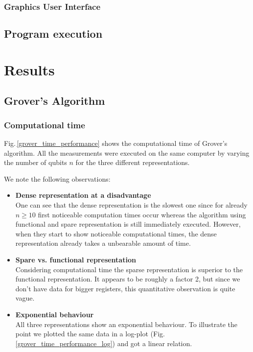 \documentclass[bibliography=totocnumbered]{article}
\theoremstyle{NoticeStyle}
\begin{document}
\subsubsection{Graphics User Interface}

\subsection{Program execution}


%
\section{Results}\label{sec:Results}

\subsection{Grover's Algorithm}\label{sec:Grover}




\subsubsection{Computational time}

Fig.\,\ref{grover_time_performance} shows the computational time of Grover's algorithm. All the measurements were executed on the same computer by varying the number of qubits $n$ for the three different representations.

We note the following observations:
\begin{itemize}
	\item\textbf{Dense representation at a disadvantage}\\
	One can see that the dense representation is the slowest one since for already $n\geq 10$ first noticeable computation times occur whereas the algorithm using functional and spare representation is still immediately executed. However, when they start to show noticeable computational times, the dense representation already takes a unbearable amount of time.
	\item\textbf{Spare vs. functional representation}\\
	Considering computational time the sparse representation is superior to the functional representation. It appears to be roughly a factor 2, but since we don't have data for bigger registers, this quantitative observation is quite vague.
	\item\textbf{Exponential behaviour}\\
	All three representations show an exponential behaviour. To illustrate the point we plotted the same data in a log-plot (Fig.\,\ref{grover_time_performance_log}) and got a linear relation.
\end{itemize}
\end{document}
